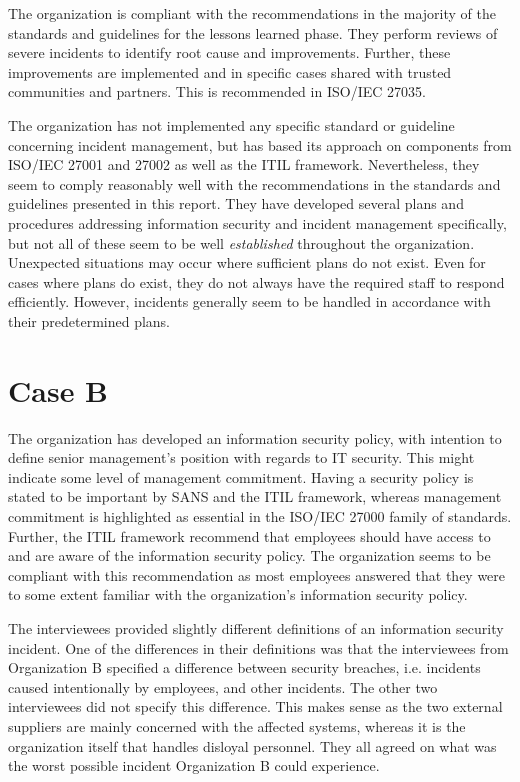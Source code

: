 The organization is compliant with the recommendations in the majority of the standards and guidelines for the lessons learned phase. They perform reviews of severe incidents to identify root cause and improvements. Further, these improvements are implemented and in specific cases shared with trusted communities and partners. This is recommended in ISO/IEC 27035. 

The organization has not implemented any specific standard or guideline concerning incident management, but has based its approach on components from ISO/IEC 27001 and 27002 as well as the \ac{ITIL} framework. Nevertheless, they seem to comply reasonably well with the recommendations in the standards and guidelines presented in this report. They have developed several plans and procedures addressing information security and incident management specifically, but not all of these seem to be well \textit{established} throughout the organization. Unexpected situations may occur where sufficient plans do not exist. Even for cases where plans do exist, they do not always have the required staff to respond efficiently. However, incidents generally seem to be handled in accordance with their predetermined plans.


\section{Case B}
The organization has developed an information security policy, with intention to define senior management's position with regards to IT security. This might indicate some level of management commitment. Having a security policy is stated to be important by SANS and the ITIL framework, whereas management commitment is highlighted as essential in the ISO/IEC 27000 family of standards. Further, the ITIL framework recommend that employees should have access to and are aware of the information security policy. The organization seems to be compliant with this recommendation as most employees answered that they were to some extent familiar with the organization's information security policy. 

The interviewees provided slightly different definitions of an information security incident. One of the differences in their definitions was that the interviewees from Organization B specified a difference between security breaches, i.e. incidents caused intentionally by employees, and other incidents. The other two interviewees did not specify this difference. This makes sense as the two external suppliers are mainly concerned with the affected systems, whereas it is the organization itself that handles disloyal personnel. They all agreed on what was the worst possible incident Organization B could experience.

